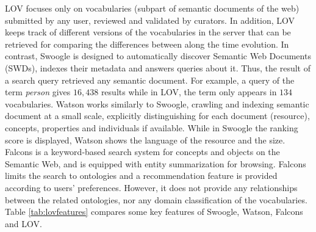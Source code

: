LOV focuses only on vocabularies (subpart of semantic documents of the web) submitted by any user, reviewed and validated by curators. In addition, LOV keeps track of different versions of the vocabularies in the server that can be retrieved for comparing the differences between along the time evolution.  In contrast, Swoogle is designed to automatically discover Semantic Web Documents (SWDs), indexes their metadata and answers queries about it. Thus, the result of a search query retrieved any semantic document. For example, a query of the term \textit{person} gives $16,438$ results while in LOV, the term only  appears in $134$ vocabularies.
Watson works similarly to Swoogle, crawling and indexing semantic document at a small scale, explicitly distinguishing for each document (resource), concepts, properties and individuals if available. While in Swoogle  the ranking score is displayed, Watson shows the language of the resource and the size. Falcons is a keyword-based search system for concepts and objects on the Semantic Web, and is equipped with entity summarization for browsing. Falcons limits the search  to ontologies and a recommendation feature is provided according to users' preferences. However, it does not provide any relationships between the related ontologies, nor any domain classification of the vocabularies.
Table \ref{tab:lovfeatures} compares some key features of Swoogle, Watson, Falcons and LOV.
 \begin{table}[!htb]
\end{table}


